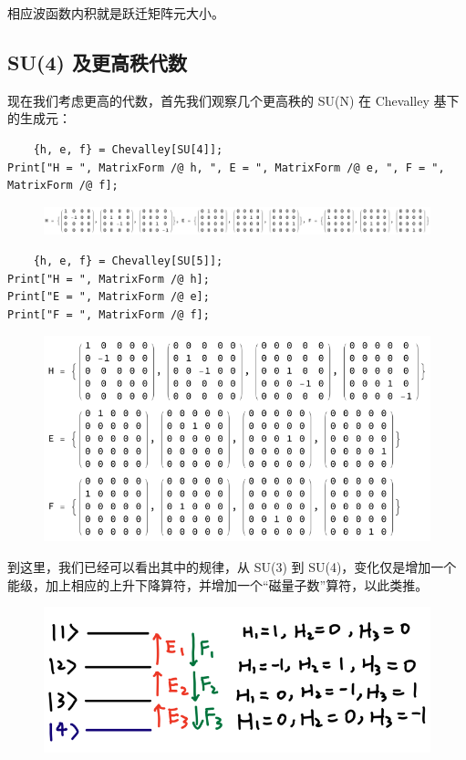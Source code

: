 \documentclass[UTF8]{ctexart}
\begin{document}
\noindent 相应波函数内积就是跃迁矩阵元大小。

\subsection*{SU(4) 及更高秩代数}
\noindent 现在我们考虑更高的代数，首先我们观察几个更高秩的 SU(N) 在 Chevalley 基下的生成元：
\begin{verbatim}
	{h, e, f} = Chevalley[SU[4]];
Print["H = ", MatrixForm /@ h, ", E = ", MatrixForm /@ e, ", F = ", MatrixForm /@ f];
\end{verbatim}

\begin{figure}[H]
\begin{centering}
\includegraphics[width=0.95\linewidth]{include/O8}
\par\end{centering}
\end{figure}

\begin{verbatim}
	{h, e, f} = Chevalley[SU[5]];
Print["H = ", MatrixForm /@ h];
Print["E = ", MatrixForm /@ e];
Print["F = ", MatrixForm /@ f];
\end{verbatim}

\begin{figure}[H]
\begin{centering}
\includegraphics[width=0.6\linewidth]{include/O9}
\par\end{centering}
\end{figure}

\noindent 到这里，我们已经可以看出其中的规律，从 SU(3) 到 SU(4)，变化仅是增加一个能级，加上相应的上升下降算符，并增加一个“磁量子数”算符，以此类推。

\begin{figure}[H]
\begin{centering}
\includegraphics[width=0.5\linewidth]{include/P2}
\par\end{centering}
\end{figure}
\end{document}
